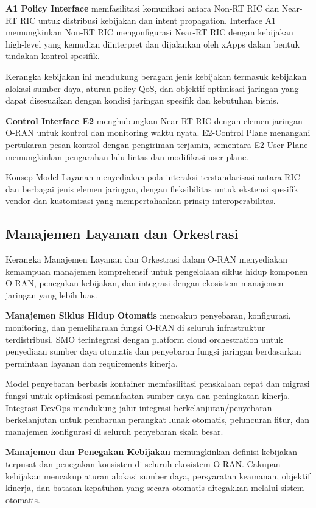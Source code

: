 \textbf{A1 Policy Interface} memfasilitasi komunikasi antara Non-RT RIC dan Near-RT RIC untuk distribusi kebijakan dan intent propagation. Interface A1 memungkinkan Non-RT RIC mengonfigurasi Near-RT RIC dengan kebijakan high-level yang kemudian diinterpret dan dijalankan oleh xApps dalam bentuk tindakan kontrol spesifik.

Kerangka kebijakan ini mendukung beragam jenis kebijakan termasuk kebijakan alokasi sumber daya, aturan policy QoS, dan objektif optimisasi jaringan yang dapat disesuaikan dengan kondisi jaringan spesifik dan kebutuhan bisnis.

\textbf{Control Interface E2} menghubungkan Near-RT RIC dengan elemen jaringan O-RAN untuk kontrol dan monitoring waktu nyata. E2-Control Plane menangani pertukaran pesan kontrol dengan pengiriman terjamin, sementara E2-User Plane memungkinkan pengarahan lalu lintas dan modifikasi user plane.

Konsep Model Layanan menyediakan pola interaksi terstandarisasi antara RIC dan berbagai jenis elemen jaringan, dengan fleksibilitas untuk ekstensi spesifik vendor dan kustomisasi yang mempertahankan prinsip interoperabilitas.

\subsection{Manajemen Layanan dan Orkestrasi}

Kerangka Manajemen Layanan dan Orkestrasi dalam O-RAN menyediakan kemampuan manajemen komprehensif untuk pengelolaan siklus hidup komponen O-RAN, penegakan kebijakan, dan integrasi dengan ekosistem manajemen jaringan yang lebih luas.

\textbf{Manajemen Siklus Hidup Otomatis} mencakup penyebaran, konfigurasi, monitoring, dan pemeliharaan fungsi O-RAN di seluruh infrastruktur terdistribusi. SMO terintegrasi dengan platform cloud orchestration untuk penyediaan sumber daya otomatis dan penyebaran fungsi jaringan berdasarkan permintaan layanan dan requirements kinerja.

Model penyebaran berbasis kontainer memfasilitasi penskalaan cepat dan migrasi fungsi untuk optimisasi pemanfaatan sumber daya dan peningkatan kinerja. Integrasi DevOps mendukung jalur integrasi berkelanjutan/penyebaran berkelanjutan untuk pembaruan perangkat lunak otomatis, peluncuran fitur, dan manajemen konfigurasi di seluruh penyebaran skala besar.

\textbf{Manajemen dan Penegakan Kebijakan} memungkinkan definisi kebijakan terpusat dan penegakan konsisten di seluruh ekosistem O-RAN. Cakupan kebijakan mencakup aturan alokasi sumber daya, persyaratan keamanan, objektif kinerja, dan batasan kepatuhan yang secara otomatis ditegakkan melalui sistem otomatis.

